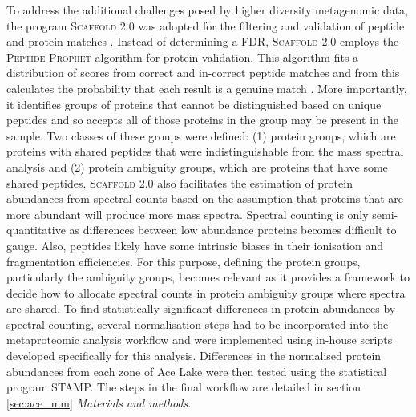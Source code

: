 To address the additional challenges posed by higher diversity metagenomic data, the program \textsc{Scaffold} 2.0 was adopted for the filtering and validation of peptide and protein matches . 
Instead of determining a \ac{FDR}, \textsc{Scaffold} 2.0 employs the \textsc{Peptide Prophet} algorithm \cite{Keller2002} for protein validation.
This algorithm fits a distribution of scores from correct and in-correct peptide matches and from this calculates the probability that each result is a genuine match \cite{Keller2002}. 
More importantly, it identifies groups of proteins that cannot be distinguished based on unique peptides and so accepts all of those proteins in the group may be present in the sample.
Two classes of these groups were defined: (1) protein groups, which are proteins with shared peptides that were indistinguishable from the mass spectral analysis and (2) protein ambiguity groups, which are proteins that have some shared peptides.
\textsc{Scaffold} 2.0 also facilitates the estimation of protein abundances from spectral counts based on the assumption that proteins that are more abundant will produce more mass spectra.
Spectral counting is only semi-quantitative as differences between low abundance proteins becomes difficult to gauge.
Also, peptides likely have some intrinsic biases in their ionisation and fragmentation efficiencies.
For this purpose, defining the protein groups, particularly the ambiguity groups, becomes relevant as it provides a framework to decide how to allocate spectral counts in protein ambiguity groups where spectra are shared.
To find statistically significant differences in protein abundances by spectral counting, several normalisation steps had to be incorporated into the metaproteomic analysis workflow and were implemented using in-house scripts developed specifically for this analysis.
Differences in the normalised protein abundances from each zone of Ace Lake were then tested using the statistical program \ac{STAMP}.
The steps in the final workflow are detailed in section \ref{sec:ace_mm} \emph{Materials and methods}.

